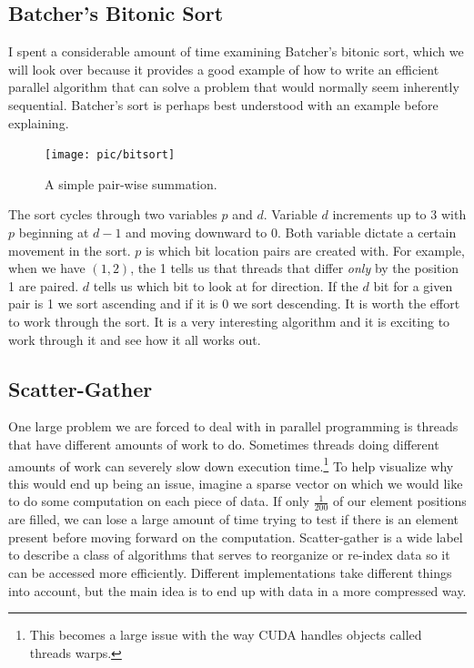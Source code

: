 \documentclass{article}
\begin{document}
    \subsection{Batcher's Bitonic Sort}
      I spent a considerable amount of time examining Batcher's bitonic sort, which we will look over because it provides a good example of how to write an efficient parallel algorithm that can solve a problem that would normally seem inherently sequential. Batcher's sort is perhaps best understood with an example before explaining. 
      
     \done{}
    \begin{figure}
    \centering
    \texttt{[image: pic/bitsort]}
    \caption{A simple pair-wise summation.}
    \end{figure}

    The sort cycles through two variables $p$ and $d$. Variable $d$ increments up to 3 with $p$ beginning at $d-1$ and moving downward to 0. Both variable dictate a certain movement in the sort. $p$ is which bit location pairs are created with. For example, when we have $(1,2)$, the 1 tells us that threads that differ \emph{only} by the position 1 are paired. $d$ tells us which bit to look at for direction. If the $d$ bit for a given pair is 1 we sort ascending and if it is 0 we sort descending. It is worth the effort to work through the sort. It is a very interesting algorithm and it is exciting to work through it and see how it all works out.



    \subsection{Scatter-Gather}
    \label{sec.sg}
    One large problem we are forced to deal with in parallel programming is threads that have different amounts of work to do. Sometimes threads doing different amounts of work can severely slow down execution time.\footnote{This becomes a large issue with the way CUDA handles objects called threads warps.} To help visualize why this would end up being an issue, imagine a sparse vector on which we would like to do some computation on each piece of data. If only $\frac{1}{200}$ of our element positions are filled, we can lose a large amount of time trying to test if there is an element present before moving forward on the computation. Scatter-gather is a wide label to describe a class of algorithms that serves to reorganize or re-index data so it can be accessed more efficiently. Different implementations take different things into account, but the main idea is to end up with data in a more compressed way.
\end{document}
